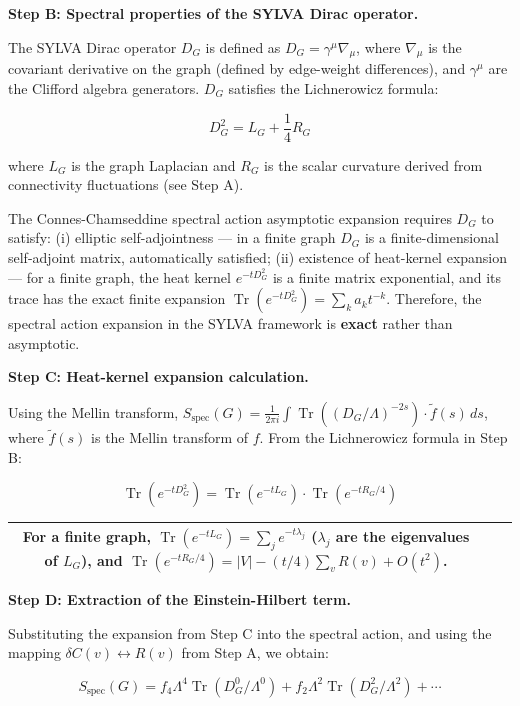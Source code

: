 \documentclass[11pt,a4paper]{article}
\theoremstyle{plain}
\theoremstyle{definition}
\begin{document}
\textbf{Step B: Spectral properties of the SYLVA Dirac operator.}

The SYLVA Dirac operator $D_G$ is defined as $D_G = \gamma^\mu \nabla_\mu$, where $\nabla_\mu$ is the covariant derivative on the graph (defined by edge-weight differences), and $\gamma^\mu$ are the Clifford algebra generators. $D_G$ satisfies the Lichnerowicz formula:

$$D_G^2 = L_G + \frac{1}{4} R_G$$

where $L_G$ is the graph Laplacian and $R_G$ is the scalar curvature derived from connectivity fluctuations (see Step A).

The Connes-Chamseddine spectral action asymptotic expansion requires $D_G$ to satisfy: (i) elliptic self-adjointness — in a finite graph $D_G$ is a finite-dimensional self-adjoint matrix, automatically satisfied; (ii) existence of heat-kernel expansion — for a finite graph, the heat kernel $e^{-tD_G^2}$ is a finite matrix exponential, and its trace has the exact finite expansion $\operatorname{Tr}(e^{-tD_G^2}) = \sum_k a_k t^{-k}$. Therefore, the spectral action expansion in the SYLVA framework is \textbf{exact} rather than asymptotic.

\textbf{Step C: Heat-kernel expansion calculation.}

Using the Mellin transform, $S_{\text{spec}}(G) = \frac{1}{2\pi i} \int \operatorname{Tr}((D_G/\Lambda)^{-2s}) \cdot \tilde{f}(s) \, ds$, where $\tilde{f}(s)$ is the Mellin transform of $f$. From the Lichnerowicz formula in Step B:

$$\operatorname{Tr}(e^{-tD_G^2}) = \operatorname{Tr}(e^{-tL_G}) \cdot \operatorname{Tr}(e^{-tR_G/4})$$

\begin{table}[h]
\centering
\begin{tabular}{|c|c|c|}
\hline
For a finite graph, $\operatorname{Tr}(e^{-tL_G}) = \sum_j e^{-t\lambda_j}$ ($\lambda_j$ are the eigenvalues of $L_G$), and $\operatorname{Tr}(e^{-tR_G/4}) = |V| - (t/4) \sum_v R(v) + O(t^2)$. \\ \hline
\end{tabular}
\end{table}

\textbf{Step D: Extraction of the Einstein-Hilbert term.}

Substituting the expansion from Step C into the spectral action, and using the mapping $\delta C(v) \leftrightarrow R(v)$ from Step A, we obtain:

$$S_{\text{spec}}(G) = f_4 \Lambda^4 \operatorname{Tr}(D_G^0/\Lambda^0) + f_2 \Lambda^2 \operatorname{Tr}(D_G^2/\Lambda^2) + \cdots$$
\end{document}
